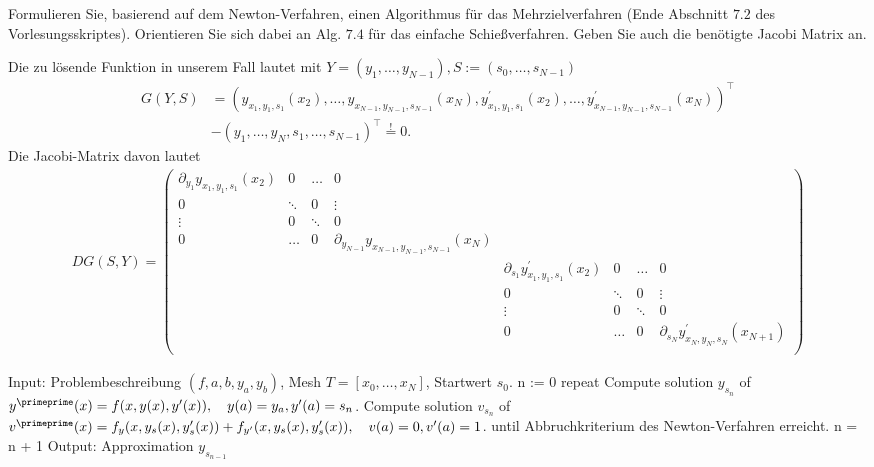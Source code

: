 \begin{exercise}
  Formulieren Sie, basierend auf dem Newton-Verfahren, einen Algorithmus für das
  Mehrzielverfahren (Ende Abschnitt $7.2$ des Vorlesungsskriptes). Orientieren
  Sie sich dabei an Alg. $7.4$ für das einfache Schießverfahren. Geben Sie auch
  die benötigte Jacobi Matrix an.
\end{exercise}

\begin{solution}
  Die zu lösende Funktion in unserem Fall lautet mit $Y = (y_1,\dots,y_{N-1}),
  S := (s_0,\dots,s_{N-1})$
  \begin{align*}
    G(Y,S) &= (y_{x_1,y_1,s_1}(x_2),\dots,y_{x_{N-1},y_{N-1},s_{N-1}}(x_N),
    y^{\prime}_{x_1,y_1,s_1}(x_2),\dots,y^{\prime}_{x_{N-1},y_{N-1},s_{N-1}}(x_N))^{\top} \\
    &- (y_1,\dots,y_N,s_1,\dots,s_{N-1})^{\top}
    \stackrel{!}{=} 0.
  \end{align*}
  Die Jacobi-Matrix davon lautet
  \begin{align*}
    DG(S,Y) = \begin{pmatrix}
      \partial_{y_1}y_{x_1,y_1,s_1}(x_2) & 0 & \hdots & 0 & & & & \\
      0 & \ddots & 0  & \vdots & & & & \\
      \vdots & 0 & \ddots & 0 & & & &\\
      0 & \hdots & 0 & \partial_{y_{N-1}}y_{x_{N-1},y_{N-1},s_{N-1}}(x_{N}) & & & &\\
       & & & & \partial_{s_1}y^{\prime}_{x_1,y_1,s_1}(x_2) & 0 & \hdots & 0 \\
       & & & & 0 & \ddots & 0  & \vdots \\
       & & & & \vdots & 0 & \ddots & 0 \\
       & & & & 0 & \hdots & 0 & \partial_{s_N}y^{\prime}_{x_N,y_N,s_N}(x_{N+1}) \\
  \end{pmatrix}
  \end{align*}
  \begin{algorithm}[caption={Mehrzielverfahren.}, label={alg1}]
   Input: Problembeschreibung $(f,a,b,y_a,y_b)$, Mesh $T = [x_0,\dots,x_N]$, Startwert $s_0$.
   n := 0
   repeat
     Compute solution $y_{s_n}$ of $y^{\primeprime}(x) = f(x,y(x),y^{\prime}(x)), \quad
     y(a) = y_a, y^{\prime}(a) = s_n$.
     Compute solution $v_{s_n}$ of $v^{\primeprime}(x) = f_y(x,y_s(x),y_s^{\prime}(x))
     + f_{y^{\prime}}(x,y_s(x),y_s^{\prime}(x)), \quad v(a) = 0, v^{\prime}(a) = 1$.
   until Abbruchkriterium des Newton-Verfahren erreicht.
   n = n + 1
   Output: Approximation $y_{s_{n-1}}$
  \end{algorithm}
\end{solution}
